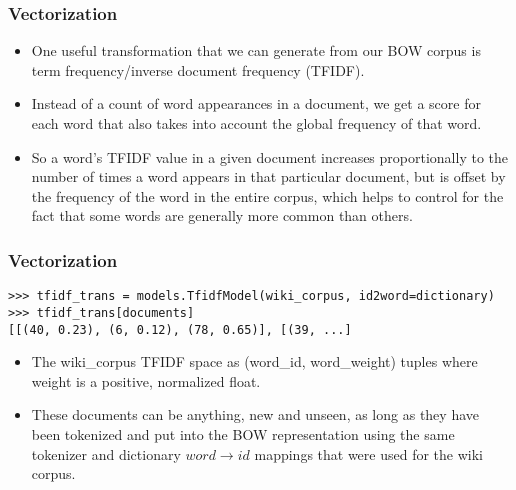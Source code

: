 \begin{frame}[fragile]\frametitle{Vectorization}
  \begin{itemize}
\item One useful transformation that we can generate from our BOW corpus is term frequency/inverse document frequency (TFIDF). 
\item Instead of a count of word appearances in a document, we get a score for each word that also takes into account the global frequency of that word. 
\item So a word's TFIDF value in a given document increases proportionally to the number of times a word appears in that particular document, but is offset by the frequency of the word in the entire corpus, which helps to control for the fact that some words are generally more common than others.
  \end{itemize}
\end{frame}

\begin{frame}[fragile]\frametitle{Vectorization}
\begin{lstlisting}
>>> tfidf_trans = models.TfidfModel(wiki_corpus, id2word=dictionary)  
>>> tfidf_trans[documents]  
[[(40, 0.23), (6, 0.12), (78, 0.65)], [(39, ...]

\end{lstlisting}
  \begin{itemize}
\item The wiki\_corpus TFIDF space as (word\_id, word\_weight) tuples where weight is a positive, normalized float. 
\item These documents can be anything, new and unseen, as long as they have been tokenized and put into the BOW representation using the same tokenizer and dictionary $word \rightarrow id$ mappings that were used for the wiki corpus.
  \end{itemize}
\end{frame}
%

